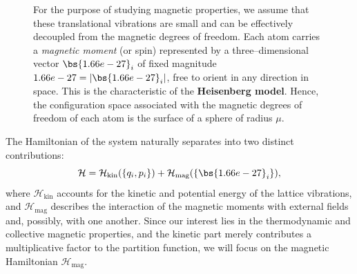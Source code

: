 \begin{figure}[H]
    \begin{minipage}[b]{0.35\textwidth}
        \centering
    \end{minipage}
    \hfill
    \begin{minipage}[b]{0.6\textwidth}
        For the purpose of studying magnetic properties, we assume that these translational vibrations are small and can be effectively decoupled from the magnetic degrees of freedom.
        Each atom carries a \textit{magnetic moment} (or spin) represented by a three--dimensional vector \(\bs{\mu}_i\) of fixed magnitude \(\mu = |\bs{\mu}_i|\), free to orient in any direction in space. This is the characteristic of the \textbf{Heisenberg model}.
        Hence, the configuration space associated with the magnetic degrees of freedom of each atom is the surface of a sphere of radius \(\mu\).
    \end{minipage}
\end{figure}

The Hamiltonian of the system naturally separates into two distinct contributions:
\[
    \mathcal{H} = \mathcal{H}_{\text{kin}}(\{q_i, p_i\}) + \mathcal{H}_{\text{mag}}(\{\bs{\mu}_i\}),
\]
where \(\mathcal{H}_{\text{kin}}\) accounts for the kinetic and potential energy of the lattice vibrations, and \(\mathcal{H}_{\text{mag}}\) describes the interaction of the magnetic moments with external fields and, possibly, with one another.
Since our interest lies in the thermodynamic and collective magnetic properties, and the kinetic part merely contributes a multiplicative factor to the partition function, we will focus on the magnetic Hamiltonian \(\mathcal{H}_{\text{mag}}\).

